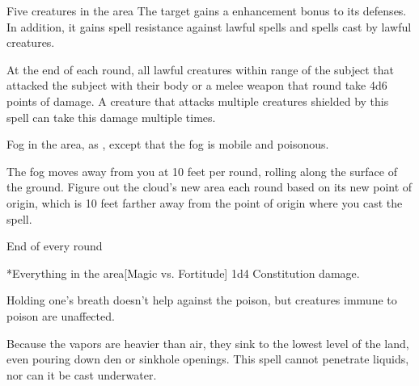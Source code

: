 \spelldur{\durshort \dismissable}
\begin{spelltarget}{Five creatures in the area}
    The target gains a  enhancement bonus to its defenses. In addition, it gains spell resistance against lawful spells and spells cast by lawful creatures.
    \par At the end of each round, all lawful creatures within \rngclose range of the subject that attacked the subject with their body or a melee weapon that round take 4d6 points of damage. A creature that attacks multiple creatures shielded by this spell can take this damage multiple times.
\end{spelltarget}
\spellline
{}

\spelldur{\durshort}
\spellline
\spelleffect Fog in the area, as , except that the fog is mobile and poisonous.

\par The fog moves away from you at 10 feet per round, rolling along the surface of the ground. Figure out the cloud's new area each round based on its new point of origin, which is 10 feet farther away from the point of origin where you cast the spell.
\begin{spelltrigger}{End of every round}
    \begin{spelltargets}*{Everything in the area}[Magic vs. Fortitude]
        \spellsuccess 1d4 Constitution damage.
    \end{spelltargets}
\end{spelltrigger}
\spellnotes Holding one's breath doesn't help against the poison, but creatures immune to poison are unaffected.
\par Because the vapors are heavier than air, they sink to the lowest level of the land, even pouring down den or sinkhole openings. This spell cannot penetrate liquids, nor can it be cast underwater.

